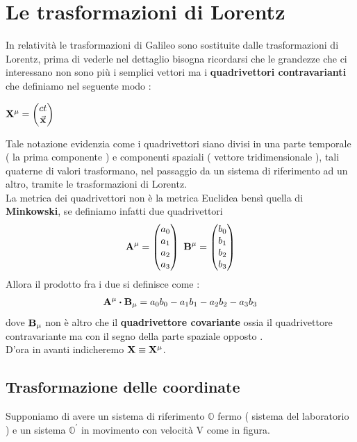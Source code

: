 \chapter{Le trasformazioni di Lorentz }
In relatività le trasformazioni di Galileo sono sostituite dalle trasformazioni di Lorentz, prima di vederle nel dettaglio bisogna ricordarsi 
che le grandezze che ci interessano non sono più i semplici vettori ma i \textbf{ quadrivettori contravarianti } che definiamo nel seguente modo :
\begin{center}
        
        $ \vectorbold{X^{\mu}} = \begin{pmatrix} ct\\ \va{x} \end{pmatrix} $

\end{center}
Tale notazione evidenzia come i quadrivettori siano divisi in una parte temporale ( la prima componente ) e componenti spaziali ( vettore tridimensionale ), 
tali quaterne di valori trasformano, nel passaggio da un sistema di riferimento ad un altro, tramite le trasformazioni di Lorentz. \\
La metrica dei quadrivettori non è la metrica Euclidea bensì quella di \textbf{Minkowski}, se definiamo infatti due quadrivettori 
\begin{align*}
        \vectorbold{A^{\mu}} = \begin{pmatrix} a_0\\a_1\\a_2\\a_3\end{pmatrix}
        \
        \vectorbold{B^{\mu}} = \begin{pmatrix} b_0\\b_1\\b_2\\b_3\end{pmatrix}
\end{align*}
Allora il prodotto fra i due si definisce come :
\begin{align*}
        \vectorbold{A^{\mu}}\vdot\vectorbold{B_{\mu}} = a_0b_0 - a_1b_1 - a_2b_2 - a_3b_3
\end{align*}
dove $\vectorbold{B_{\mu}}$ non è altro che il \textbf{quadrivettore covariante} ossia il quadrivettore contravariante ma con il segno della parte spaziale opposto .\\
D'ora in avanti indicheremo $\vectorbold{X} \equiv \vb{X^{\mu}} $.
\newpage

\section{Trasformazione delle coordinate}
Supponiamo di avere un sistema di riferimento $\mathbb O$ fermo ( sistema del laboratorio ) e un sistema $\mathbb O^{'} $ in movimento 
con velocità V come in figura.\\

